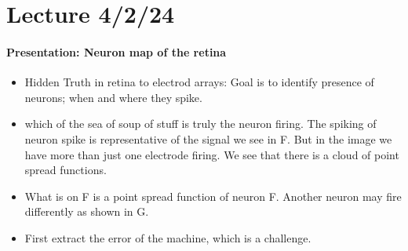 \documentclass[../main.tex]{subfiles}
\begin{document}
\newpage
\section*{Lecture 4/2/24}
\paragraph*{Presentation: Neuron map of the retina}
\begin{itemize}
    \item Hidden Truth in retina to electrod arrays: Goal is to identify presence of neurons; when
    and where they spike. 
    \item which of the sea of soup of stuff is truly the neuron firing. The spiking of neuron spike
    is representative of the signal we see in F. But in the image we have more than just one 
    electrode firing. We see that there is a cloud of point spread functions.
    \item What is on F is a point spread function of neuron F. Another neuron may fire differently
    as shown in G. 
    \item First extract the error of the machine, which is a challenge. 
\end{itemize}
\end{document}
